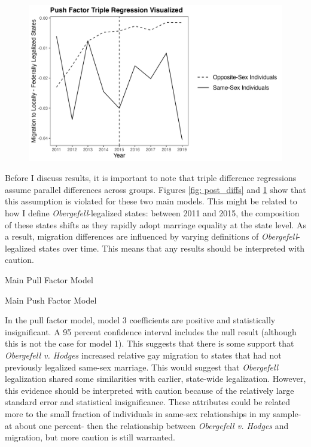 \documentclass[12pt,letterpaper]{article}
\begin{document}
\begin{figure}[htbp]
    \centering
    \includegraphics[width=0.75\linewidth]{outputs/summary_stats/ante_diffs.png}
    \caption{}
    \label{fig: ante_diffs}
\end{figure}

Before I discuss results, it is important to note that triple difference regressions assume parallel differences across groups. Figures \ref{fig: post_diffs} and \ref{fig: ante_diffs} show that this assumption is violated for these two main models. This might be related to how I define \textit{Obergefell}-legalized states: between 2011 and 2015, the composition of these states shifts as they rapidly adopt marriage equality at the state level. As a result, migration differences are influenced by varying definitions of \textit{Obergefell}-legalized states over time. This means that any results should be interpreted with caution.

\begin{table}[htbp]
    \centering
    \caption{Main Pull Factor Model}
    \label{tab: expost_model}
    
\end{table}
\begin{table}[htbp]
    \centering
    \caption{Main Push Factor Model}
    \label{tab: exante_model}
    
\end{table}

In the pull factor model, model 3 coefficients are positive and statistically insignificant. A 95 percent confidence interval includes the null result (although this is not the case for model 1). This suggests that there is some support that \textit{Obergefell v. Hodges} increased relative gay migration to states that had not previously legalized same-sex marriage. This would suggest that \textit{Obergefell} legalization shared some similarities with earlier, state-wide legalization. However, this evidence should be interpreted with caution because of the relatively large standard error and statistical insignificance. These attributes could be related more to the small fraction of individuals in same-sex relationships in my sample- at about one percent- then the relationship between \textit{Obergefell v. Hodges} and migration, but more caution is still warranted.
\end{document}
